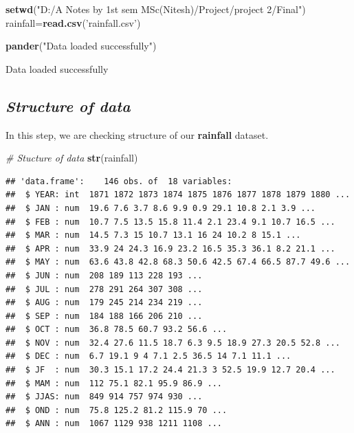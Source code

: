 \documentclass[12pt,openany]{book}
\newenvironment{Shaded}{\begin{snugshade}}{\end{snugshade}}
\newcommand{\CommentTok}[1]{\textcolor[rgb]{0.56,0.35,0.01}{\textit{#1}}}
\newcommand{\KeywordTok}[1]{\textcolor[rgb]{0.13,0.29,0.53}{\textbf{#1}}}
\newcommand{\NormalTok}[1]{#1}
\newcommand{\StringTok}[1]{\textcolor[rgb]{0.31,0.60,0.02}{#1}}
\begin{document}
\begin{Shaded}
\begin{Highlighting}[]
\KeywordTok{setwd}\NormalTok{(}\StringTok{"D:/A Notes by 1st sem MSc(Nitesh)/Project/project 2/Final"}\NormalTok{)}
\NormalTok{rainfall=}\KeywordTok{read.csv}\NormalTok{(}\StringTok{'rainfall.csv'}\NormalTok{)}

\KeywordTok{pander}\NormalTok{(}\StringTok{"Data loaded successfully"}\NormalTok{)}
\end{Highlighting}
\end{Shaded}

Data loaded successfully

\hypertarget{structure-of-data}{%
\subsection{\texorpdfstring{\emph{Structure of data}}{Structure of data}}\label{structure-of-data}}

In this step, we are checking structure of our \textbf{rainfall} dataset.

\begin{Shaded}
\begin{Highlighting}[]
\CommentTok{# Stucture of data}
\KeywordTok{str}\NormalTok{(rainfall)}
\end{Highlighting}
\end{Shaded}

\begin{verbatim}
## 'data.frame':    146 obs. of  18 variables:
##  $ YEAR: int  1871 1872 1873 1874 1875 1876 1877 1878 1879 1880 ...
##  $ JAN : num  19.6 7.6 3.7 8.6 9.9 0.9 29.1 10.8 2.1 3.9 ...
##  $ FEB : num  10.7 7.5 13.5 15.8 11.4 2.1 23.4 9.1 10.7 16.5 ...
##  $ MAR : num  14.5 7.3 15 10.7 13.1 16 24 10.2 8 15.1 ...
##  $ APR : num  33.9 24 24.3 16.9 23.2 16.5 35.3 36.1 8.2 21.1 ...
##  $ MAY : num  63.6 43.8 42.8 68.3 50.6 42.5 67.4 66.5 87.7 49.6 ...
##  $ JUN : num  208 189 113 228 193 ...
##  $ JUL : num  278 291 264 307 308 ...
##  $ AUG : num  179 245 214 234 219 ...
##  $ SEP : num  184 188 166 206 210 ...
##  $ OCT : num  36.8 78.5 60.7 93.2 56.6 ...
##  $ NOV : num  32.4 27.6 11.5 18.7 6.3 9.5 18.9 27.3 20.5 52.8 ...
##  $ DEC : num  6.7 19.1 9 4 7.1 2.5 36.5 14 7.1 11.1 ...
##  $ JF  : num  30.3 15.1 17.2 24.4 21.3 3 52.5 19.9 12.7 20.4 ...
##  $ MAM : num  112 75.1 82.1 95.9 86.9 ...
##  $ JJAS: num  849 914 757 974 930 ...
##  $ OND : num  75.8 125.2 81.2 115.9 70 ...
##  $ ANN : num  1067 1129 938 1211 1108 ...
\end{verbatim}
\end{document}
